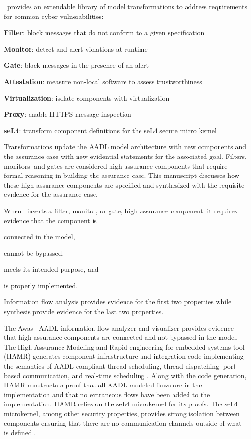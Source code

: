 \brfcs\ provides an extendable library of model transformations to address requirements for common cyber vulnerabilities:
\begin{compactitem}
	\item \textbf{Filter}: block messages that do not conform to a given specification
	\item \textbf{Monitor}: detect and alert violations at runtime
	\item \textbf{Gate}: block messages in the presence of an alert
	\item \textbf{Attestation}: measure non-local software to assess trustworthiness
	\item \textbf{Virtualization}: isolate components with virtualization
	\item \textbf{Proxy}: enable HTTPS message inspection 
	\item \textbf{seL4}: transform component definitions for the seL4 secure micro kernel
\end{compactitem}
Transformations update the AADL model architecture with new components and the assurance case with new evidential statements for the associated goal.
Filters, monitors, and gates are considered high assurance components that require formal reasoning in building the assurance case.
This manuscript discusses how these high assurance components are specified and synthesized with the requisite evidence for the assurance case.

When \brfcs\ inserts a filter, monitor, or gate, high assurance component, it requires evidence that the component is 
\begin{compactenum}
	\item connected in the model, 
	\item cannot be bypassed, 
	\item meets its intended purpose, and
	\item is properly implemented.
\end{compactenum}
Information flow analysis provides evidence for the first two properties while synthesis provide evidence for the last two properties.

The Awas~\cite{awas} AADL information flow analyzer and visualizer provides evidence that high assurance components are connected and not bypassed in the model.
The High Assurance Modeling and Rapid engineering for embedded systems tool (HAMR) generates component infrastructure and integration code implementing the semantics of AADL-compliant thread scheduling, thread dispatching, port-based communication, and real-time scheduling \cite{hamr}.
Along with the code generation, HAMR constructs a proof that all AADL modeled flows are in the implementation and that no extraneous flows have been added to the implementation.
HAMR relies on the seL4 microkernel for its proofs.
The seL4 microkernel, among other security properties, provides strong isolation between components ensuring that there are no communication channels outside of what is defined \cite{sel4-sosp09, sel4-tocs14, sel4-cacm18}.

